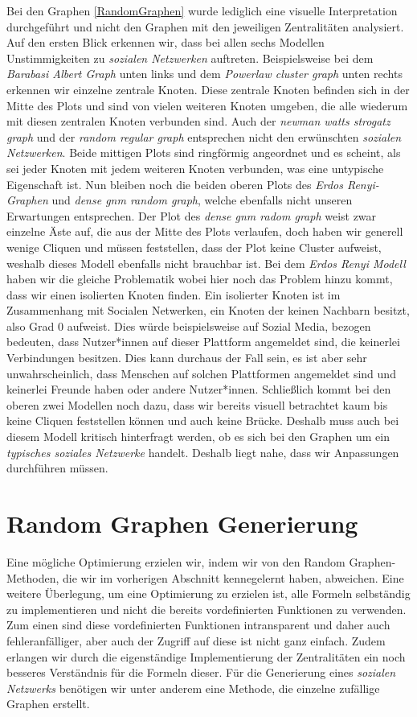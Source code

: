 Bei den Graphen \ref{RandomGraphen} wurde lediglich eine visuelle Interpretation durchgeführt und nicht den Graphen mit den jeweiligen Zentralitäten analysiert. Auf den ersten Blick erkennen wir, dass bei allen sechs Modellen Unstimmigkeiten zu \textit{sozialen Netzwerken} auftreten. Beispielsweise bei dem \textit{Barabasi Albert Graph} unten links und dem \textit{Powerlaw cluster graph} unten rechts erkennen wir einzelne zentrale Knoten. Diese zentrale Knoten befinden sich in der Mitte des Plots und sind von vielen weiteren Knoten umgeben, die alle wiederum mit diesen zentralen Knoten verbunden sind. Auch der \textit{newman watts strogatz graph} und der \textit{random regular graph} entsprechen nicht den erwünschten \textit{sozialen Netzwerken}. Beide mittigen Plots sind ringförmig angeordnet und es scheint, als sei jeder Knoten mit jedem weiteren Knoten verbunden, was eine untypische Eigenschaft ist. Nun bleiben noch die beiden oberen Plots des \textit{Erdos Renyi-Graphen} und \textit{dense gnm random graph}, welche ebenfalls nicht unseren Erwartungen entsprechen. Der Plot des \textit{dense gnm radom graph} weist zwar einzelne Äste auf, die aus der Mitte des Plots verlaufen, doch haben wir generell wenige Cliquen und müssen feststellen, dass der Plot keine Cluster aufweist, weshalb dieses Modell ebenfalls nicht brauchbar ist. Bei dem \textit{Erdos Renyi Modell} haben wir die gleiche Problematik wobei hier noch das Problem hinzu kommt, dass wir einen isolierten Knoten finden. Ein isolierter Knoten ist im Zusammenhang mit Socialen Netwerken, ein Knoten der keinen Nachbarn besitzt, also Grad $0$ aufweist.
Dies würde beispielsweise auf Sozial Media, bezogen bedeuten, dass Nutzer*innen auf dieser Plattform angemeldet sind, die keinerlei Verbindungen besitzen. Dies kann durchaus der Fall sein, es ist aber sehr unwahrscheinlich, dass Menschen auf solchen Plattformen angemeldet sind und keinerlei Freunde haben oder andere Nutzer*innen. Schließlich kommt bei den oberen zwei Modellen noch dazu, dass wir bereits visuell betrachtet kaum bis keine Cliquen feststellen können und auch keine Brücke. Deshalb muss auch bei diesem Modell kritisch hinterfragt werden, ob es sich bei den Graphen um ein \textit{typisches soziales Netzwerke} handelt. Deshalb liegt nahe, dass wir Anpassungen durchführen müssen.

\section{Random Graphen Generierung}
Eine mögliche Optimierung erzielen wir, indem wir von den Random Graphen-Methoden, die wir im vorherigen Abschnitt kennegelernt haben, abweichen. Eine weitere Überlegung, um eine Optimierung zu erzielen ist, alle Formeln selbständig zu implementieren und nicht die bereits vordefinierten Funktionen zu verwenden. Zum einen sind diese vordefinierten Funktionen intransparent und daher auch fehleranfälliger, aber auch der Zugriff auf diese ist nicht ganz einfach. Zudem erlangen wir durch die eigenständige Implementierung der Zentralitäten ein noch besseres Verständnis für die Formeln dieser.
Für die Generierung eines \textit{sozialen Netzwerks} benötigen wir unter anderem eine Methode, die einzelne zufällige Graphen erstellt. 

